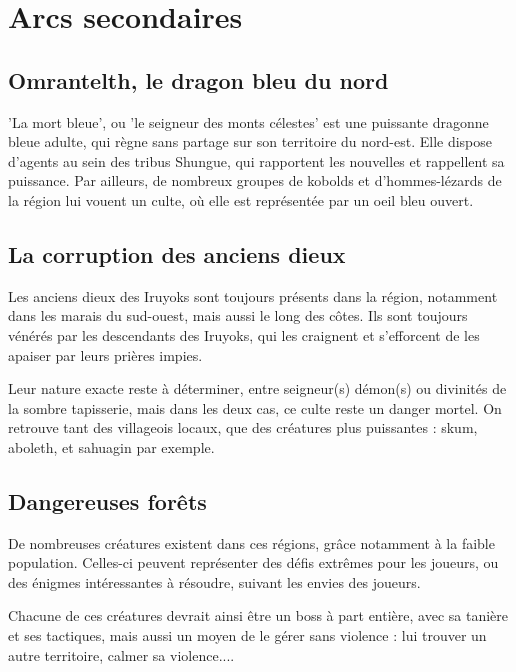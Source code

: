 \documentclass[10pt,a4paper]{book}
\begin{document}
\section{Arcs secondaires}
\subsection{Omrantelth, le dragon bleu du nord}
'La mort bleue', ou 'le seigneur des monts célestes' est une puissante dragonne bleue adulte, qui règne sans partage sur son territoire du nord-est. Elle dispose d'agents au sein des tribus Shungue, qui rapportent les nouvelles et rappellent sa puissance. Par ailleurs, de nombreux groupes de kobolds et d'hommes-lézards de la région lui vouent un culte, où elle est représentée par un oeil bleu ouvert.
\subsection{La corruption des anciens dieux}
Les anciens dieux des Iruyoks sont toujours présents dans la région, notamment dans les marais du sud-ouest, mais aussi le long des côtes. Ils sont toujours vénérés par les descendants des Iruyoks, qui les craignent et s'efforcent de les apaiser par leurs prières impies.

Leur nature exacte reste à déterminer, entre seigneur(s) démon(s) ou divinités de la sombre tapisserie, mais dans les deux cas, ce culte reste un danger mortel. On retrouve tant des villageois locaux, que des créatures plus puissantes : skum, aboleth, et sahuagin par exemple.
\subsection{Dangereuses forêts}
De nombreuses créatures existent dans ces régions, grâce notamment à la faible population. Celles-ci peuvent représenter des défis extrêmes pour les joueurs, ou des énigmes intéressantes à résoudre, suivant les envies des joueurs.

Chacune de ces créatures devrait ainsi être un boss à part entière, avec sa tanière et ses tactiques, mais aussi un moyen de le gérer sans violence : lui trouver un autre territoire, calmer sa violence....
\end{document}
